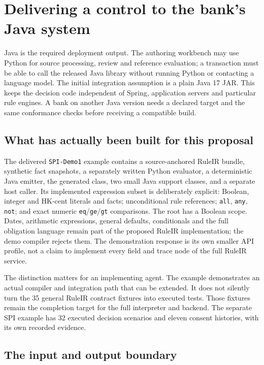 \section{Delivering a control to the bank's Java system}
\label{sec:java}

Java is the required deployment output. The authoring workbench may use Python
for source processing, review and reference evaluation; a transaction must be
able to call the released Java library without running Python or contacting a
language model. The initial integration assumption is a plain Java 17 JAR.
This keeps the decision code independent of Spring, application servers and
particular rule engines. A bank on another Java version needs a declared target
and the same conformance checks before receiving a compatible build.

\subsection{What has actually been built for this proposal}

The delivered \texttt{SPI-Demo1} example contains a source-anchored RuleIR bundle,
synthetic fact snapshots, a separately written Python evaluator, a deterministic
Java emitter, the generated class, two small Java support classes, and a separate
host caller. Its implemented expression subset is deliberately explicit:
Boolean, integer and HK-cent literals and facts; unconditional rule references;
\texttt{all}, \texttt{any}, \texttt{not}; and exact numeric
\texttt{eq}/\texttt{ge}/\texttt{gt} comparisons. The root has a Boolean scope.
Dates, arithmetic expressions, general defaults, conditionals and the full
obligation language remain part of the proposed RuleIR implementation; the demo
compiler rejects them. The demonstration response is its own smaller API profile,
not a claim to implement every field and trace node of the full RuleIR service.

The distinction matters for an implementing agent. The example demonstrates an
actual compiler and integration path that can be extended. It does not silently
turn the 35 general RuleIR contract fixtures into executed tests. Those fixtures
remain the completion target for the full interpreter and backend. The separate
SPI example has 32 executed decision scenarios and eleven consent histories, with
its own recorded evidence.

\subsection{The input and output boundary}

